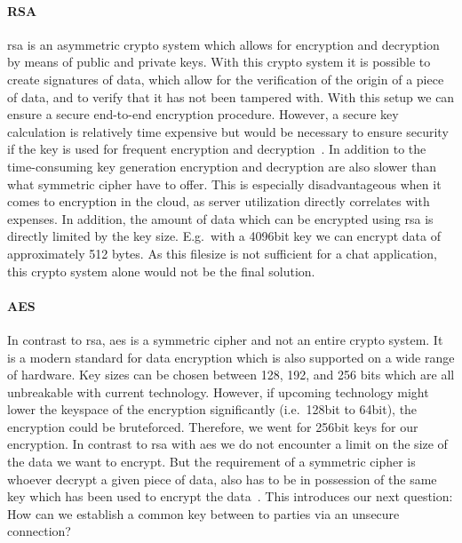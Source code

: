 \paragraph{RSA}
\ac{rsa} is an asymmetric crypto system which allows for encryption and decryption by means of public and private keys.
With this crypto system it is possible to create signatures of data, which allow for the verification of the origin of
a piece of data, and to verify that it has not been tampered with.
With this setup we can ensure a secure end-to-end encryption procedure.
However, a secure key calculation is relatively time expensive but would be necessary to ensure security if the key
is used for frequent encryption and decryption~\cite{rsa}.
In addition to the time-consuming key generation encryption and decryption are also slower than what symmetric
cipher have to offer.
This is especially disadvantageous when it comes to encryption in the cloud, as server utilization directly correlates
with expenses.
In addition, the amount of data which can be encrypted using \ac{rsa} is directly limited by the key size.
E.g.\ with a 4096bit key we can encrypt data of approximately 512 bytes.
As this filesize is not sufficient for a chat application, this crypto system alone would not be the final solution.

\paragraph{AES}
In contrast to \ac{rsa}, \ac{aes} is a symmetric cipher and not an entire crypto system.
It is a modern standard for data encryption which is also supported on a wide range of hardware.
Key sizes can be chosen between 128, 192, and 256 bits which are all unbreakable with current technology.
However, if upcoming technology might lower the keyspace of the encryption significantly (i.e.\ 128bit to 64bit),
the encryption could be bruteforced.
Therefore, we went for 256bit keys for our encryption.
In contrast to \ac{rsa} with \ac{aes} we do not encounter a limit on the size of the data we want to encrypt.
But the requirement of a symmetric cipher is whoever decrypt a given piece of data, also has to be in possession of the
same key which has been used to encrypt the data~\cite{aes}.
This introduces our next question: How can we establish a common key between to parties via an unsecure connection?

